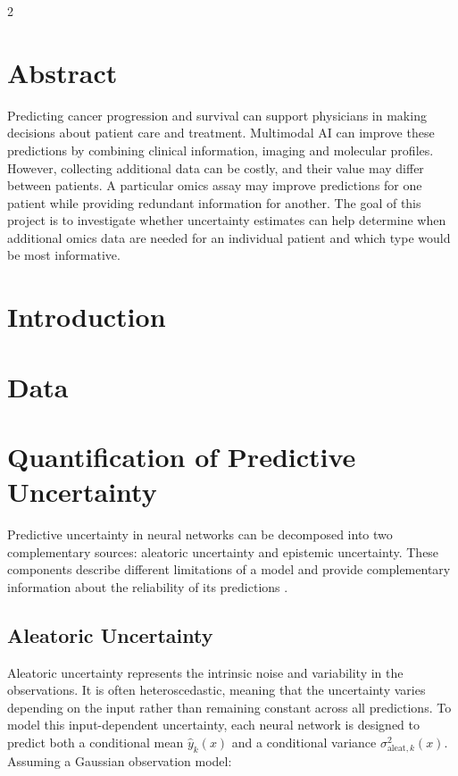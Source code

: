 \documentclass[10pt]{article}
\begin{document}
\clearpage

\tableofcontents
\newpage

\nocite{*}
\begin{multicols}{2}
\section*{Abstract}
Predicting cancer progression and survival can support physicians in making decisions about patient
care and treatment. Multimodal AI can improve these predictions by combining clinical information,
imaging and molecular profiles. However, collecting additional data can be costly, and their value may
differ between patients. A particular omics assay may improve predictions for one patient while
providing redundant information for another. The goal of this project is to investigate whether
uncertainty estimates can help determine when additional omics data are needed for an individual
patient and which type would be most informative.
\section{Introduction}

\section{Data}

\section{Quantification of Predictive Uncertainty}
Predictive uncertainty in neural networks can be decomposed into two complementary sources: 
aleatoric uncertainty and epistemic uncertainty. 
These components describe different limitations of a model and provide complementary information about the reliability of its predictions \cite{hullermeier2021aleatoric}.

\subsection{Aleatoric Uncertainty}
Aleatoric uncertainty represents the intrinsic noise and variability in the observations. It is often heteroscedastic, 
meaning that the uncertainty varies depending on the input rather than remaining constant across all predictions.
To model this input-dependent uncertainty, 
each neural network is designed to predict both a conditional mean \(\hat{y}_k(x)\) and a conditional variance \(\sigma^2_{\text{aleat},k}(x)\). 
Assuming a Gaussian observation model:


\end{multicols}
\end{document}
